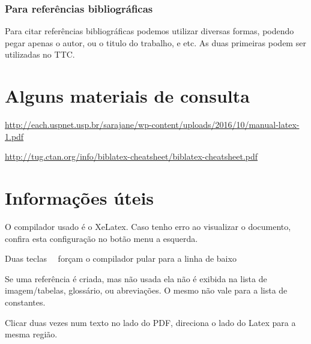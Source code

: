 

\subsubsection{Para referências bibliográficas}
Para citar referências bibliográficas podemos utilizar diversas formas, podendo pegar apenas o autor, ou o titulo do trabalho, e etc. As duas primeiras podem ser utilizadas no TTC.

\cite{rao}

\parencite{rao}

\citeauthor{rao}


\section{Alguns materiais de consulta}


\url{http://each.uspnet.usp.br/sarajane/wp-content/uploads/2016/10/manual-latex-1.pdf}

\url{http://tug.ctan.org/info/biblatex-cheatsheet/biblatex-cheatsheet.pdf}

\section{Informações úteis}


O compilador usado é o XeLatex. Caso tenho erro ao visualizar o documento, confira esta configuração no botão menu a esquerda.

Duas teclas \ \ forçam o compilador pular para a linha de baixo

Se uma referência é criada, mas não usada ela não é exibida na lista de imagem/tabelas, glossário, ou abreviações. O mesmo não vale para a lista de constantes.

Clicar duas vezes num texto no lado do PDF, direciona o lado do Latex para a mesma região.